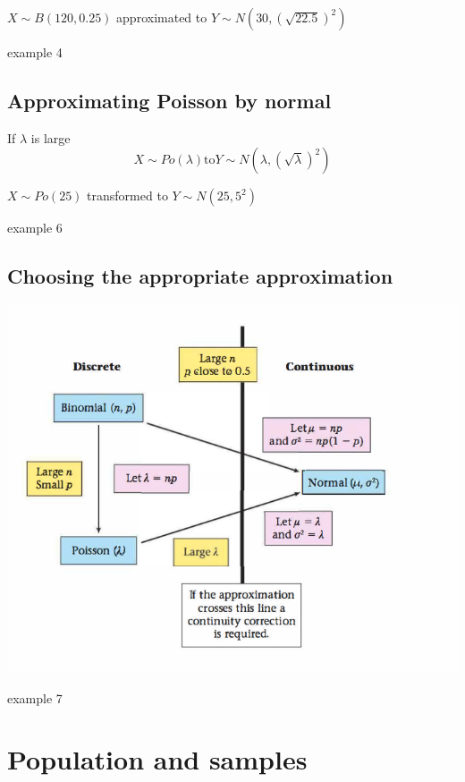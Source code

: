 \documentclass[a4paper]{article}
\begin{document}
\begin{eg}
	$X\sim B(120,0.25)$ approximated to $Y\sim N(30,(\sqrt{22.5})^2)$
\end{eg}

\begin{eg}
	example 4
\end{eg}

\subsection{Approximating Poisson by normal}
If $\lambda$ is large
\[
	X\sim Po(\lambda) \text{to} Y\sim N(\lambda,(\sqrt{\lambda})^2)
\]

\begin{eg}
	$X\sim Po(25)$ transformed to $Y\sim N(25,5^2)$
\end{eg}

\begin{eg}
	example 6
\end{eg}

\subsection{Choosing the appropriate approximation}
\begin{center}
	\includegraphics[scale=0.5]{img_S/13_3_intro}
\end{center}
\begin{eg}
	example 7
\end{eg}

\section{Population and samples}
\end{document}
